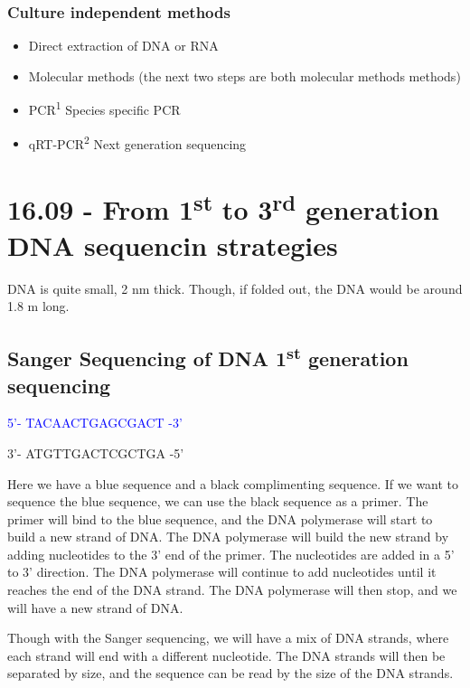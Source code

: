 \subsubsection*{Culture independent methods}

\begin{highlight}
    \begin{itemize}
        \item Direct extraction of DNA or RNA
        \item Molecular methods (the next two steps are both molecular methods methods) 
        \item PCR\textsuperscript{1}
        \subitem Species specific PCR
        \item qRT-PCR\textsuperscript{2}
        \subitem Next generation sequencing
    \end{itemize}
\end{highlight}

\section{16.09 - From 1\textsuperscript{st} to 3\textsuperscript{rd} generation DNA sequencin strategies}

DNA is quite small, 2 nm thick. Though, if folded out, the DNA would be around 1.8 m long. 


\subsection{Sanger Sequencing of DNA
1\textsuperscript{st} generation sequencing}

\textcolor{blue}{5'- TACAACTGAGCGACT -3'}

3'- ATGTTGACTCGCTGA -5'

Here we have a blue sequence and a black complimenting sequence. If we want to sequence the blue sequence, we can use the black sequence as a primer. The primer will bind to the blue sequence, and the DNA polymerase will start to build a new strand of DNA. The DNA polymerase will build the new strand by adding nucleotides to the 3' end of the primer. The nucleotides are added in a 5' to 3' direction. The DNA polymerase will continue to add nucleotides until it reaches the end of the DNA strand. The DNA polymerase will then stop, and we will have a new strand of DNA. 

Though with the Sanger sequencing, we will have a mix of DNA strands, where each strand will end with a different nucleotide. The DNA strands will then be separated by size, and the sequence can be read by the size of the DNA strands.

